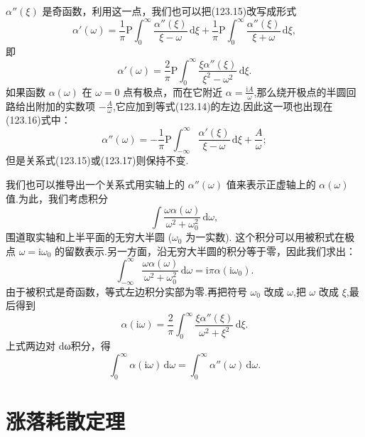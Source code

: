 $\alpha''(\xi)$ 是奇函数，利用这一点，我们也可以把(123.15)改写成形式
\begin{equation*}
  \alpha'(\omega)=\frac{1}{\pi}\mathrm{P}\int_0^{\infty}
  \frac{\alpha''(\xi)}{\xi-\omega}\,\mathrm{d}\xi
  +\frac{1}{\pi}\mathrm{P}\int_0^{\infty}
  \frac{\alpha''(\xi)}{\xi+\omega}\,\mathrm{d}\xi,
\end{equation*}
即
\begin{equation}
  \alpha'(\omega)=\frac{2}{\pi}\mathrm{P}\int_0^{\infty}
  \frac{\xi\alpha''(\xi)}{\xi^2-\omega^2}\,\mathrm{d}\xi.
\end{equation}
如果函数 $\alpha(\omega)$ 在 $\omega=0$ 点有极点，而在它附近 $\alpha=\frac{\mathrm{i}A}{\omega}$,那么绕开极点的半圆回路给出附加的实数项 $-\frac{A}{\omega}$,它应加到等式(123.14)的左边.因此这一项也出现在(123.16)式中：
\begin{equation}
  \alpha''(\omega)=-\frac{1}{\pi}\mathrm{P}\int_{-\infty}^{\infty}
  \frac{\alpha'(\xi)}{\xi-\omega}\,\mathrm{d}\xi+\frac{A}{\omega};
\end{equation}
但是关系式(123.15)或(123.17)则保持不变.

我们也可以推导出一个关系式用实轴上的 $\alpha''(\omega)$ 值来表示正虚轴上的 $\alpha(\omega)$ 值.为此，我们考虑积分
\begin{equation*}
  \int\frac{\omega\alpha(\omega)}{\omega^2+\omega_0^2}\,\mathrm{d}\omega,
\end{equation*}
围道取实轴和上半平面的无穷大半圆 ($\omega_0$ 为一实数). 这个积分可以用被积式在极点 $\omega=\mathrm{i}\omega_0$ 的留数表示.另一方面，沿无穷大半圆的积分等于零，因此我们求出：
\begin{equation*}
  \int_{-\infty}^{\infty}\frac{\omega\alpha(\omega)}{\omega^2+\omega_0^2}\,\mathrm{d}\omega
  =\mathrm{i}\pi\alpha(\mathrm{i}\omega_0).
\end{equation*}
由于被积式是奇函数，等式左边积分实部为零.再把符号 $\omega_0$ 改成 $\omega$,把 $\omega$ 改成 $\xi$,最后得到
\begin{equation}
  \alpha(\mathrm{i}\omega)=\frac{2}{\pi}\int_0^{\infty}
  \frac{\xi\alpha''(\xi)}{\omega^2+\xi^2}\,\mathrm{d}\xi.
\end{equation}
上式两边对 dω积分，得
\begin{equation}
  \int_0^{\infty}\alpha(\mathrm{i}\omega)\,\mathrm{d}\omega
  =\int_0^{\infty}\alpha''(\omega)\,\mathrm{d}\omega.
\end{equation}

\section{涨落耗散定理}

